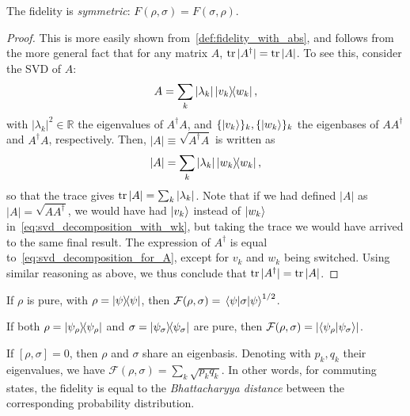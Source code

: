 \documentclass[a4paper]{report}
\newcommand{\RR}{\mathbb{R}}
\newcommand{\calF}{{\mathcal{F}}}
\begin{document}
\begin{prop}
	The fidelity is \emph{symmetric}: $F(\rho,\sigma)=F(\sigma,\rho)$.
\end{prop}
\begin{proof}
	This is more easily shown from~\cref{def:fidelity_with_abs}, and follows from the more general fact that for any matrix $A$, $\tr|A^\dagger|=\tr|A|$.
	To see this, consider the \ac{SVD} of $A$:
	\begin{equation}
		A = \sum_k |\lambda_k| \ketbra{v_k}{w_k},
		\label{eq:svd_decomposition_for_A}
	\end{equation}
	with $|\lambda_k|^2\in\RR$ the eigenvalues of $A^\dagger A$, and $\{\ket{v_k}\}_k,\{\ket{w_k}\}_k$ the eigenbases of $AA^\dagger$ and $A^\dagger A$, respectively.
	Then, $|A|\equiv\sqrt{A^\dagger A}$ is written as
	\begin{equation}
		|A| = \sum_k |\lambda_k| \ketbra{w_k}{w_k},
		\label{eq:svd_decomposition_with_wk}
	\end{equation}
	so that the trace gives $\tr|A| = \sum_k |\lambda_k|$.
	Note that if we had defined $|A|$ as $|A|=\sqrt{AA^\dagger}$, we would have had $\ket{v_k}$ instead of $\ket{w_k}$ in~\cref{eq:svd_decomposition_with_wk}, but taking the trace we would have arrived to the same final result.
	The expression of $A^\dagger$ is equal to~\cref{eq:svd_decomposition_for_A}, except for $v_k$ and $w_k$ being switched. Using similar reasoning as above, we thus conclude that $\tr|A^\dagger|=\tr|A|$.
\end{proof}

\begin{prop}
	If $\rho$ is pure, with $\rho=\ketbra\psi$, then
	$\calF(\rho,\sigma)=\mel{\psi}{\sigma}{\psi}^{1/2}$.
\end{prop}

\begin{prop}
	If both $\rho=\ketbra{\psi_\rho}$ and $\sigma=\ketbra{\psi_\sigma}$ are pure, then
	$\calF(\rho,\sigma)=\lvert\braket{\psi_\rho}{\psi_\sigma}\rvert$.
\end{prop}

\begin{prop}
	If $[\rho,\sigma]=0$, then $\rho$ and $\sigma$ share an eigenbasis. Denoting with $p_k, q_k$ their eigenvalues, we have $\calF(\rho,\sigma)=\sum_k\sqrt{p_k q_k}$.
	In other words, for commuting states, the fidelity is equal to the \emph{Bhattacharyya distance} between the corresponding probability distribution.
\end{prop}
\end{document}
